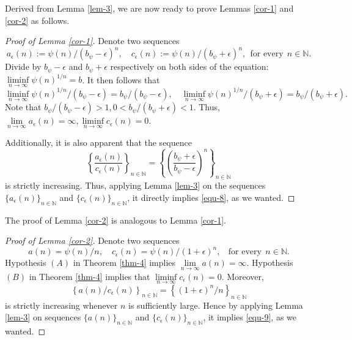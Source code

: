 \documentclass[12pt,reqno]{amsart}
\renewcommand{\=}{\coloneqq}
\theoremstyle{plain}
\begin{document}
\bigskip




		
Derived from Lemma \ref{lem-3}, we are now ready to prove Lemmas \ref{cor-1} and \ref{cor-2} as follows.
		
\begin{proof}[Proof of Lemma \ref{cor-1}]
Denote two sequences
\begin{equation*}
a_\epsilon (n):= \psi(n)/(b_{\psi}-\epsilon)^n,\quad c_\epsilon (n):= \psi(n)/(b_{\psi}+\epsilon)^n,~~\mbox{for every}~~n\in\mathbb{N}.
\end{equation*}
Divide by $b_{\psi}-\epsilon$ and $b_{\psi}+\epsilon$ respectively on both sides of the equation: $\liminf\limits_{n\to \infty} {\psi(n)}^{1/n} = b$. It then follows that
\begin{equation*}
\liminf\limits_{n\to \infty} {\psi(n)}^{1/n}/(b_{\psi}-\epsilon) = b_{\psi}/(b_{\psi}-\epsilon), \quad \liminf\limits_{n\to \infty} {\psi(n)}^{1/n}/(b_{\psi}+\epsilon) = b_{\psi}/(b_{\psi}+\epsilon).
\end{equation*}
Note that $b_{\psi}/(b_{\psi}-\epsilon)>1, 0<b_{\psi}/(b_{\psi}+\epsilon)<1$. Thus, $\lim\limits_{n\to\infty} a_\epsilon (n) = \infty, \liminf\limits_{n\to\infty} c_\epsilon (n) = 0$.

Additionally, it is also apparent that the sequence
$$
\left\{\frac{a_\epsilon (n)}{c_\epsilon (n)}\right\}_{n\in\mathbb{N}} = \left\{\left(\frac{b_{\psi}+\epsilon}{b_{\psi}-\epsilon}\right)^n\right\}_{n\in\mathbb{N}}
$$
is strictly increasing. Thus, applying Lemma \ref{lem-3} on the sequences $\{a_{\epsilon}(n)\}_{n\in\mathbb{N}}$ and $\{c_{\epsilon}(n)\}_{n\in\mathbb{N}}$, it directly implies \eqref{equ-8}, as we wanted.
\end{proof}
		
The proof of Lemma \ref{cor-2} is analogous to Lemma \ref{cor-1}.	
\begin{proof}[Proof of Lemma \ref{cor-2}]
Denote two sequences
$$
a(n) = \psi(n)/n,\quad c_\epsilon (n) = \psi(n)/(1+\epsilon)^n,~~~~\mbox{for every}~~n\in\mathbb{N}.
$$
Hypothesis $(A)$ in Theorem \ref{thm-4} implies $\lim\limits_{n\to\infty}a(n)=\infty$. Hypothesis $(B)$ in Theorem \ref{thm-4} implies that $\liminf\limits_{n\to\infty} c_\epsilon(n) = 0$. Moreover,
$$
\left\{a(n)/c_\epsilon(n)\right\}_{n\in\mathbb{N}} = \left\{(1+\epsilon)^n/n\right\}_{n\in\mathbb{N}}
$$
is strictly increasing whenever $n$ is sufficiently large. Hence by applying Lemma \ref{lem-3} on sequences $\{a(n)\}_{n\in\mathbb{N}}$ and $\{c_{\epsilon}(n)\}_{n\in\mathbb{N}}$, it implies \eqref{equ-9}, as we wanted.
		\end{proof}
		
\end{document}
